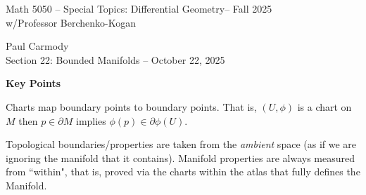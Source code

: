 \documentclass[12pt,a4paper]{report}
\newcommand{\CLASSNAME}{Math 5050 -- Special Topics: Differential Geometry}
\newcommand{\STUDENTNAME}{Paul Carmody}
\newcommand{\ASSIGNMENT}{Section 22: Bounded Manifolds }
\newcommand{\DUEDATE}{October 22, 2025}
\newcommand{\PROFESSOR}{Professor Berchenko-Kogan}
\newcommand{\SEMESTER}{Fall 2025}
\begin{document}
\begin{center}
	\Large{\CLASSNAME -- \SEMESTER} \\
	\large{ w/\PROFESSOR}
\end{center}
\begin{center}
	\STUDENTNAME \\
	\ASSIGNMENT -- \DUEDATE\\
\end{center} 

\textbf{Key Points}

\HLINE
\begin{remark}

Charts map boundary points to boundary points.  That is, $(U, \phi)$ is a chart on $M$ then $p \in \partial M$ implies $\phi(p) \in \partial\phi(U)$.
\end{remark}

\begin{remark}

Topological boundaries/properties are taken from the \textit{ambient} space (as if we are ignoring the manifold that it contains).  Manifold properties are always measured from ``within", that is, proved via the charts within the atlas that fully defines the Manifold.

\end{remark}
\end{document}
